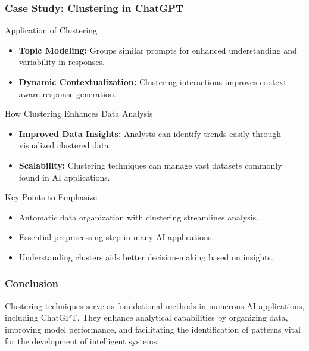 \documentclass[aspectratio=169]{beamer}
\begin{document}
\begin{frame}[fragile]
    \frametitle{Case Study: Clustering in ChatGPT}
    \begin{block}{Application of Clustering}
        \begin{itemize}
            \item \textbf{Topic Modeling:} Groups similar prompts for enhanced understanding and variability in responses.
            \item \textbf{Dynamic Contextualization:} Clustering interactions improves context-aware response generation.
        \end{itemize}
    \end{block}

    \begin{block}{How Clustering Enhances Data Analysis}
        \begin{itemize}
            \item \textbf{Improved Data Insights:} Analysts can identify trends easily through visualized clustered data.
            \item \textbf{Scalability:} Clustering techniques can manage vast datasets commonly found in AI applications.
        \end{itemize}
    \end{block}

    \begin{block}{Key Points to Emphasize}
        \begin{itemize}
            \item Automatic data organization with clustering streamlines analysis.
            \item Essential preprocessing step in many AI applications.
            \item Understanding clusters aids better decision-making based on insights.
        \end{itemize}
    \end{block}
\end{frame}

\begin{frame}[fragile]
    \frametitle{Conclusion}
    Clustering techniques serve as foundational methods in numerous AI applications, including ChatGPT. They enhance analytical capabilities by organizing data, improving model performance, and facilitating the identification of patterns vital for the development of intelligent systems.
\end{frame}
\end{document}
